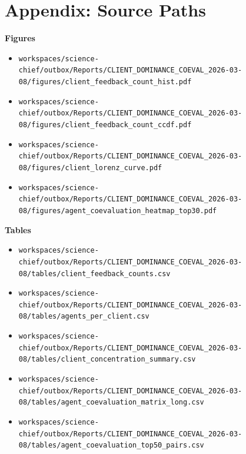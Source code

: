 \documentclass[11pt,a4paper]{article}
\begin{document}
\section*{Appendix: Source Paths}
\textbf{Figures}\\
\begin{itemize}
\item \texttt{workspaces/science-chief/outbox/Reports/CLIENT\_DOMINANCE\_COEVAL\_2026-03-08/figures/client\_feedback\_count\_hist.pdf}
\item \texttt{workspaces/science-chief/outbox/Reports/CLIENT\_DOMINANCE\_COEVAL\_2026-03-08/figures/client\_feedback\_count\_ccdf.pdf}
\item \texttt{workspaces/science-chief/outbox/Reports/CLIENT\_DOMINANCE\_COEVAL\_2026-03-08/figures/client\_lorenz\_curve.pdf}
\item \texttt{workspaces/science-chief/outbox/Reports/CLIENT\_DOMINANCE\_COEVAL\_2026-03-08/figures/agent\_coevaluation\_heatmap\_top30.pdf}
\end{itemize}

\textbf{Tables}\\
\begin{itemize}
\item \texttt{workspaces/science-chief/outbox/Reports/CLIENT\_DOMINANCE\_COEVAL\_2026-03-08/tables/client\_feedback\_counts.csv}
\item \texttt{workspaces/science-chief/outbox/Reports/CLIENT\_DOMINANCE\_COEVAL\_2026-03-08/tables/agents\_per\_client.csv}
\item \texttt{workspaces/science-chief/outbox/Reports/CLIENT\_DOMINANCE\_COEVAL\_2026-03-08/tables/client\_concentration\_summary.csv}
\item \texttt{workspaces/science-chief/outbox/Reports/CLIENT\_DOMINANCE\_COEVAL\_2026-03-08/tables/agent\_coevaluation\_matrix\_long.csv}
\item \texttt{workspaces/science-chief/outbox/Reports/CLIENT\_DOMINANCE\_COEVAL\_2026-03-08/tables/agent\_coevaluation\_top50\_pairs.csv}
\end{itemize}
\end{document}
